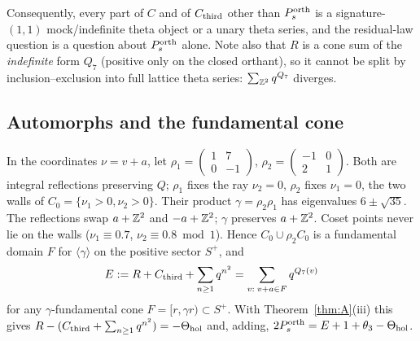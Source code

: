 Consequently, every part of $C$ and of $C_{\mathrm{third}}$ other than $P^{\mathrm{orth}}_s$ is a signature-$(1,1)$ mock/indefinite theta object or a
unary theta series, and the residual-law question is a question about $P^{\mathrm{orth}}_s$ alone. Note also that $R$ is a cone sum of the
\emph{indefinite} form $Q_7$ (positive only on the closed orthant), so it cannot be split by inclusion--exclusion into full
lattice theta series: $\sum_{\mathbb{Z}^2}q^{Q_7}$ diverges.

\subsection{Automorphs and the fundamental cone}\label{sec:cone0}
In the coordinates $\nu=v+a$, let $\rho_1=\begin{pmatrix}1&7\\0&-1\end{pmatrix}$, $\rho_2=\begin{pmatrix}-1&0\\2&1\end{pmatrix}$. Both are integral reflections preserving $Q$; $\rho_1$ fixes the ray $\nu_2=0$, $\rho_2$ fixes $\nu_1=0$, the two walls
of $C_0=\{\nu_1>0,\nu_2>0\}$. Their product $\gamma=\rho_2\rho_1$ has eigenvalues $6\pm\sqrt{35}$. The reflections swap $a+\mathbb{Z}^2$ and
$-a+\mathbb{Z}^2$; $\gamma$ preserves $a+\mathbb{Z}^2$. Coset points never lie on the walls ($\nu_1\equiv0.7$, $\nu_2\equiv0.8\bmod1$). Hence
$C_0\cup\rho_2C_0$ is a fundamental domain $F$ for $\langle\gamma\rangle$ on the positive sector $S^+$, and
\begin{equation}\label{eq:Edef}
E:=R+C_{\mathrm{third}}+\sum_{n\ge1}q^{n^2}=\sum_{v:\;v+a\in F}q^{Q_7(v)}
\end{equation}
for any $\gamma$-fundamental cone $F=[r,\gamma r)\subset S^+$. With Theorem~\ref{thm:A}(iii) this gives
$R-(C_{\mathrm{third}}+\sum_{n\ge1}q^{n^2})=-\Theta_{\mathrm{hol}}$ and, adding, $2P^{\mathrm{orth}}_s=E+1+\theta_3-\Theta_{\mathrm{hol}}$.

